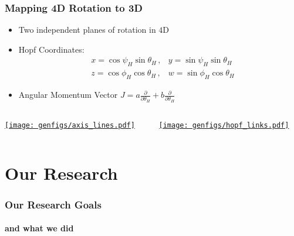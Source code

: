 \documentclass[xcolor=dvipsnames]{beamer}
\begin{document}
\begin{frame}[squeeze]
  \frametitle{Mapping 4D Rotation to 3D}
  \begin{itemize}
    \item Two independent planes of rotation in $4$D 
    \item Hopf Coordinates: 
      \begin{align*}
        &x=\cos\psi_H\sin \theta_H\,,&y=\sin \psi_H\sin \theta_H\\
        &z=\cos \phi_H\cos \theta_H\,,&w=\sin \phi_H\cos \theta_H
      \end{align*}
    \item Angular Momentum Vector $J = a\frac\partial{\partial\theta_H} + b\frac\partial{\partial\theta_H}$
  \end{itemize}
  \begin{columns}[t]
    \begin{column}{0.5\paperwidth}
      \href{https://markuspad.com/figures/axis_lines.html}{\texttt{[image: genfigs/axis\_lines.pdf]}}
    \end{column}
    \begin{column}{0.5\paperwidth}
      \href{https://markuspad.com/figures/hopf_links.html}{\texttt{[image: genfigs/hopf\_links.pdf]}}
    \end{column}
  \end{columns}
\end{frame}

\section{Our Research}

\begin{frame}
  \frametitle{Our Research Goals}
  \framesubtitle{and what we did}
\end{frame}
\end{document}
